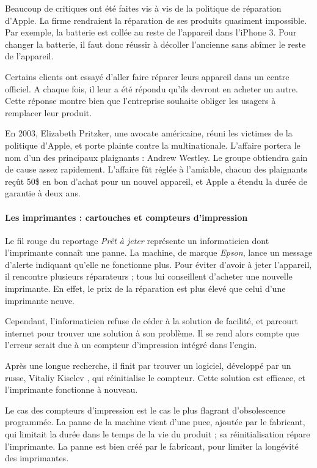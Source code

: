 \smallbreak 

Beaucoup de critiques ont été faites vis à vis de la politique de réparation d'Apple. La firme  rendraient la réparation de ses produits quasiment impossible. Par exemple, la batterie est collée au reste de l'appareil dans l'iPhone 3. Pour changer la batterie, il faut donc réussir à décoller l'ancienne sans abîmer le reste de l'appareil.  

Certains clients ont essayé d'aller faire réparer leurs appareil dans un centre officiel. A chaque fois, il leur a été répondu qu'ils devront en acheter un autre. Cette réponse montre bien que l'entreprise souhaite obliger les usagers à remplacer leur produit. 

\smallbreak


En 2003, Elizabeth Pritzker, une avocate américaine, réuni les victimes de la politique d'Apple, et porte plainte contre la multinationale. L'affaire portera le nom d'un des principaux plaignants : Andrew Westley. Le groupe obtiendra gain de cause assez rapidement. L'affaire fût réglée à l'amiable, chacun des plaignants reçût 50\$ en bon d'achat pour un nouvel appareil, et Apple a étendu la durée de garantie à deux ans. 

\paragraph*{Les imprimantes : cartouches et compteurs d'impression}

Le fil rouge du reportage \textit{Prêt à jeter} représente un informaticien dont l'imprimante connaît une panne. La machine, de marque \textit{Epson}, lance un message d'alerte indiquant qu'elle ne fonctionne plus. Pour éviter d'avoir à jeter l'appareil, il rencontre plusieurs réparateurs ; tous lui conseillent d'acheter une nouvelle imprimante. En effet, le prix de la réparation est plus élevé que celui d'une imprimante neuve. 

Cependant, l'informaticien refuse de céder à la solution de facilité, et parcourt internet pour trouver une solution à son problème. Il se rend alors compte que l'erreur serait due à un compteur d'impression intégré dans l'engin. 

Après une longue recherche, il finit par trouver un logiciel, développé par un russe, Vitaliy Kiselev , qui réinitialise le compteur. Cette solution est efficace, et l'imprimante fonctionne à nouveau.


Le cas des compteurs d'impression est le cas le plus flagrant d'obsolescence programmée. La panne de la machine vient d'une puce, ajoutée par le fabricant, qui limitait la durée dans le temps de la vie du produit ; sa réinitialisation répare l'imprimante. La panne est bien créé par le fabricant, pour limiter la longévité  des imprimantes.


